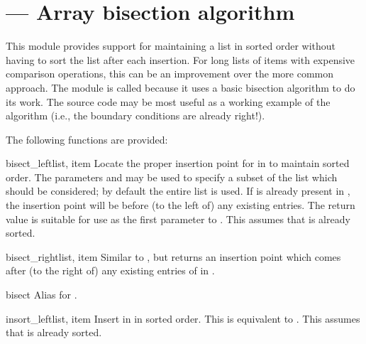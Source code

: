 \section{ ---
         Array bisection algorithm}



This module provides support for maintaining a list in sorted order
without having to sort the list after each insertion.  For long lists
of items with expensive comparison operations, this can be an
improvement over the more common approach.  The module is called
 because it uses a basic bisection algorithm to do its
work.  The source code may be most useful as a working example of the
algorithm (i.e., the boundary conditions are already right!).

The following functions are provided:

\begin{funcdesc}{bisect_left}{list, item}
  Locate the proper insertion point for  in  to
  maintain sorted order.  The parameters  and  may be
  used to specify a subset of the list which should be considered; by
  default the entire list is used.  If  is already present
  in , the insertion point will be before (to the left of)
  any existing entries.  The return value is suitable for use as the
  first parameter to .  This assumes that
   is already sorted.
\end{funcdesc}

\begin{funcdesc}{bisect_right}{list, item}
  Similar to , but returns an insertion point
  which comes after (to the right of) any existing entries of
   in .
\end{funcdesc}

\begin{funcdesc}{bisect}{\unspecified}
  Alias for .
\end{funcdesc}

\begin{funcdesc}{insort_left}{list, item}
  Insert  in  in sorted order.  This is equivalent
  to .  This assumes that  is
  already sorted.
\end{funcdesc}

